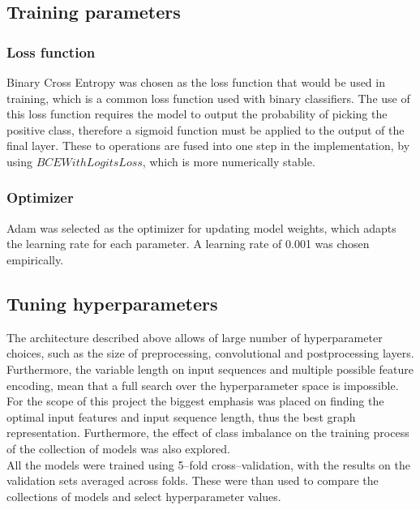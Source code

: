 \subsection{Training parameters}

\subsubsection{Loss function}
Binary Cross Entropy was chosen as the loss function that would be used in training, which is a common loss function used with binary classifiers. 
The use of this loss function requires the model to output the probability of picking the positive class, therefore a sigmoid function must be applied to the output of the final layer.
These to operations are fused into one step in the implementation, by using  $BCEWithLogitsLoss$, which is more numerically stable. 

\subsubsection{Optimizer}
Adam was selected as the optimizer for updating model weights, which adapts the learning rate for each parameter. A learning rate of 0.001 was chosen empirically.

\subsection{Tuning hyperparameters}
The architecture described above allows of large number of hyperparameter choices, such as the size of preprocessing, convolutional and postprocessing layers. Furthermore, the variable length on input sequences and multiple possible feature encoding, mean that a full search over the hyperparameter space is impossible. For the scope of this project the biggest emphasis was placed on finding the optimal input features and input sequence length, thus the best graph representation. Furthermore, the effect of class imbalance on the training process of the collection of models was also explored.\\
All the models were trained using 5--fold cross--validation, with the results on the validation sets averaged across folds. These were than used to compare the collections of models and select hyperparameter values.